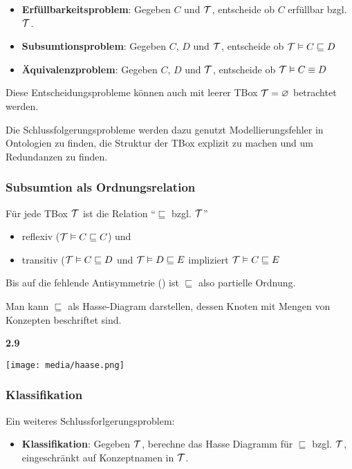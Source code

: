 \begin{itemize}
  \item \textbf{Erfüllbarkeitsproblem}: Gegeben $C$ und $\mathcal{T}$, entscheide ob $C$ erfüllbar bzgl. $\mathcal{T}$.
  \item \textbf{Subsumtionsproblem}: Gegeben $C$, $D$ und $\mathcal{T}$, entscheide ob $\mathcal{T} \vDash C \sqsubseteq D$
  \item \textbf{Äquivalenzproblem}: Gegeben $C$, $D$ und $\mathcal{T}$, entscheide ob $\mathcal{T} \vDash C \equiv D$
\end{itemize}

Diese Entscheidungsprobleme können auch mit leerer TBox $\mathcal{T} = \varnothing$ betrachtet werden.

Die Schlussfolgerungsprobleme werden dazu genutzt Modellierungsfehler in Ontologien zu finden, die Struktur der TBox explizit zu machen und um Redundanzen zu finden.

\subsubsection{Subsumtion als Ordnungsrelation}\label{subordn}

\begin{lemma} 
    Für jede TBox $\mathcal{T}$ ist die Relation \enquote{$\sqsubseteq$ bzgl. $\mathcal{T}$}

\begin{itemize}
  \item reflexiv ($\mathcal{T} \vDash C \sqsubseteq C$) und
  \item transitiv ($\mathcal{T} \vDash C \sqsubseteq D$ und $\mathcal{T} \vDash D \sqsubseteq E$ impliziert $\mathcal{T} \vDash C \sqsubseteq E$
\end{itemize}
\end{lemma}

Bis auf die fehlende Antisymmetrie () ist $\sqsubseteq$ also partielle Ordnung.

Man kann $\sqsubseteq$ als Hasse-Diagram darstellen, dessen Knoten mit Mengen von Konzepten beschriftet sind.

\textbf{2.9}

\texttt{[image: media/haase.png]}


\subsubsection{Klassifikation}

Ein weiteres Schlussforlgerungsproblem:

\begin{itemize}
  \item \textbf{Klassifikation}: Gegeben $\mathcal{T}$, berechne das Hasse Diagramm für $\sqsubseteq$ bzgl. $\mathcal{T}$, eingeschränkt auf Konzeptnamen in $\mathcal{T}$.
\end{itemize}

